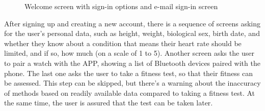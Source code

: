 \begin{figure}[h!]
    \centering
    \hfill
    \caption{Welcome screen with sign-in options and e-mail sign-in screen}
    \label{fig:sign-in-email}
\end{figure}

After signing up and creating a new account, there is a sequence of screens asking for the user's personal data, such as height, weight, biological sex, birth date, and whether they know about a condition that means their heart rate should be limited, and if so, how much (on a scale of 1 to 5).
Another screen asks the user to pair a watch with the APP, showing a list of Bluetooth devices paired with the phone.
The last one asks the user to take a fitness test, so that their fitness can be assessed.
This step can be skipped, but there's a warning about the inaccuracy of methods based on readily available data compared to taking a fitness test.
At the same time, the user is assured that the test can be taken later.

